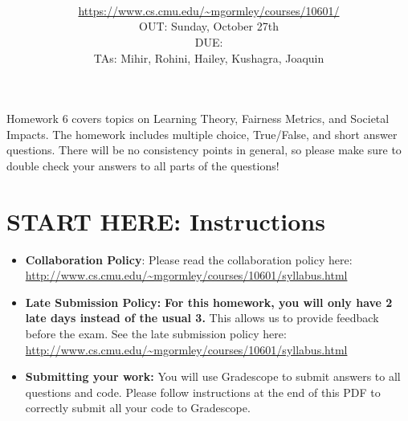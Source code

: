 \documentclass[11pt,addpoints,answers]{exam}
\title{\textsc{\hwName}
} %
\author{\courseName\\
\url{https://www.cs.cmu.edu/~mgormley/courses/10601/} \\
OUT: Sunday, October 27th \\
DUE: \dueDate{} \\ 
TAs: Mihir, Rohini, Hailey, Kushagra, Joaquin
}
\date{}
\date{}
\begin{document}
\maketitle 

\begin{notebox}
Homework 6 covers topics on Learning Theory, Fairness Metrics, and Societal Impacts. The homework includes multiple choice, True/False, and short answer questions. There will be no consistency points in general, so please make sure to double check your answers to all parts of the questions!
\end{notebox}
\newcommand \maxsubs {10 }
\section*{START HERE: Instructions}
\begin{itemize}

\item \textbf{Collaboration Policy}: Please read the collaboration policy here: \url{http://www.cs.cmu.edu/~mgormley/courses/10601/syllabus.html}

\item\textbf{Late Submission Policy:} \textbf{For this homework, you will only have 2 late days instead of the usual 3.} This allows us to provide feedback before the exam. See the late submission policy here: \url{http://www.cs.cmu.edu/~mgormley/courses/10601/syllabus.html}

\item\textbf{Submitting your work:} You will use Gradescope to submit
  answers to all questions and code. Please
  follow instructions at the end of this PDF to correctly submit all your code to Gradescope.

  \begin{itemize}
    

    

\end{itemize}
\end{itemize}
\end{document}
